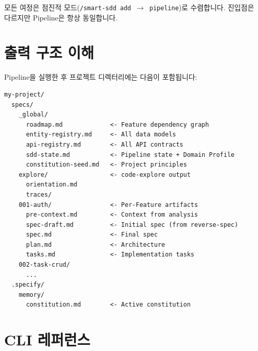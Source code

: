 \documentclass[11pt,a4paper,openright,twoside]{report}
\begin{document}
모든 여정은 점진적 모드(\texttt{/smart-sdd add $\rightarrow$ pipeline})로 수렴합니다. 진입점은 다르지만 Pipeline은 항상 동일합니다.

\section{출력 구조 이해}

Pipeline을 실행한 후 프로젝트 디렉터리에는 다음이 포함됩니다:

\begin{lstlisting}[title={Output Directory Structure}]
my-project/
  specs/
    _global/
      roadmap.md             <- Feature dependency graph
      entity-registry.md     <- All data models
      api-registry.md        <- All API contracts
      sdd-state.md           <- Pipeline state + Domain Profile
      constitution-seed.md   <- Project principles
    explore/                 <- code-explore output
      orientation.md
      traces/
    001-auth/                <- Per-Feature artifacts
      pre-context.md         <- Context from analysis
      spec-draft.md          <- Initial spec (from reverse-spec)
      spec.md                <- Final spec
      plan.md                <- Architecture
      tasks.md               <- Implementation tasks
    002-task-crud/
      ...
  .specify/
    memory/
      constitution.md        <- Active constitution
\end{lstlisting}

\section{CLI 레퍼런스}
\end{document}
